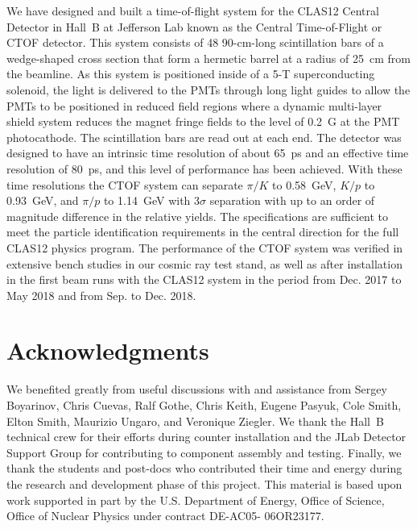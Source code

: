 \documentclass[3p,times,twocolumn]{elsarticle}
\begin{document}
We have designed and built a time-of-flight system for the CLAS12 Central Detector in Hall~B 
at Jefferson Lab known as the Central Time-of-Flight or CTOF detector. This system consists 
of 48 90-cm-long scintillation bars of a wedge-shaped cross section that form a hermetic barrel
at a radius of 25~cm from the beamline. As this system is positioned inside of a 5-T superconducting
solenoid, the light is delivered to the PMTs through long light guides to allow the PMTs to be positioned
in reduced field regions where a dynamic multi-layer shield system reduces the magnet fringe fields to
the level of 0.2~G at the PMT photocathode. The scintillation bars are read out at each end. The
detector was designed to have an intrinsic time resolution of about 65~ps and an effective time resolution
of 80~ps, and this level of performance has been achieved. With these time resolutions the CTOF system
can separate $\pi/K$ to 0.58~GeV, $K/p$ to 0.93~GeV, and $\pi/p$ to 1.14~GeV with 3$\sigma$
separation with up to an order of magnitude difference in the relative yields.  The specifications are
sufficient to meet the particle identification requirements in the central direction for the full CLAS12
physics program. The performance of the CTOF system was verified in extensive bench studies in our
cosmic ray test stand, as well as after installation in the first beam runs with the CLAS12 system in the
period from Dec. 2017 to May 2018 and from Sep. to Dec. 2018. 

\section*{Acknowledgments}

We benefited greatly from useful discussions with and assistance from Sergey Boyarinov, Chris
Cuevas, Ralf Gothe, Chris Keith, Eugene Pasyuk, Cole Smith, Elton Smith, Maurizio Ungaro, and
Veronique Ziegler. We thank the Hall~B technical crew for their efforts during counter installation
and the JLab Detector Support Group for contributing to component assembly and testing. Finally,
we thank the students and post-docs who contributed their time and energy during the research
and development phase of this project. This material is based upon work supported in part by the
U.S. Department of Energy, Office of Science, Office of Nuclear Physics under contract
DE-AC05- 06OR23177.
\end{document}
